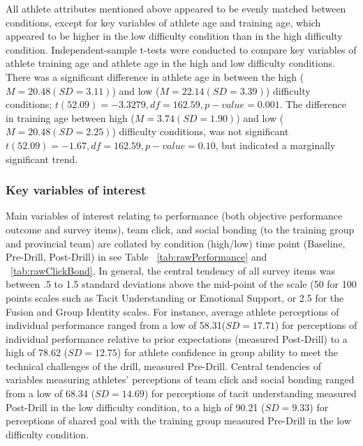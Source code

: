 All athlete attributes mentioned above appeared to be evenly matched between conditions, except for key variables of athlete age and training age, which appeared to be higher in the low difficulty condition than in the high difficulty condition. Independent-sample t-tests were conducted to compare key variables of athlete training age and athlete age in the high and low difficulty conditions. There was a significant difference in athlete age in between the high ($M= 20.48(SD =3.11)$) and low ($M= 22.14(SD =3.39)$) difficulty conditions; $t(52.09) = -3.3279, df = 162.59, p-value = 0.001$.  The difference in training age between high ($M= 3.74 (SD =1.90)$) and low ($M= 20.48(SD =2.25)$) difficulty conditions, was not significant $t(52.09)= -1.67, df = 162.59, p-value = 0.10$, but indicated a marginally significant trend.




\subsubsection{Key variables of interest \label{sec:surveyResponses}}

Main variables of interest relating to performance (both objective performance outcome and survey items), team click, and social bonding (to the training group and provincial team) are collated by condition (high/low) time point (Baseline, Pre-Drill, Post-Drill) in see Table ~\ref{tab:rawPerformance} and ~\ref{tab:rawClickBond}. In general, the central tendency of all survey items was between .5 to 1.5 standard deviations above the mid-point of the scale (50 for 100 points scales such as Tacit Understanding or Emotional Support, or 2.5 for the Fusion and Group Identity scales.   For instance, average athlete perceptions of individual performance ranged from a low of 58.31($SD = 17.71$) for perceptions of individual performance relative to prior expectations (measured Post-Drill) to a high of 78.62 ($SD = 12.75$) for athlete confidence in group ability to meet the technical challenges of the drill, measured Pre-Drill.  Central tendencies of variables measuring athletes' perceptions of team click and social bonding ranged from a low of 68.34 ($SD = 14.69$) for perceptions of tacit understanding measured Post-Drill in the low difficulty condition, to a high of 90.21 ($SD = 9.33$) for perceptions of shared goal with the training group measured Pre-Drill in the low difficulty condition.

